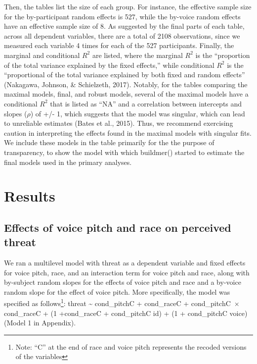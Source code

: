 \documentclass[
  english,
  man, noextraspace,floatsintext]{apa6}
\begin{document}
Then, the tables list the size of each group. For instance, the effective sample size for the by-participant random effects is 527, while the by-voice random effects have an effective sample size of 8. As suggested by the final parts of each table, across all dependent variables, there are a total of 2108 observations, since we measured each variable 4 times for each of the 527 participants. Finally, the marginal and conditional \(R^2\) are listed, where the marginal \(R^2\) is the ``proportion of the total variance explained by the fixed effects,'' while conditional \(R^2\) is the ``proportional of the total variance explained by both fixed and random effects'' (Nakagawa, Johnson, \& Schielzeth, 2017). Notably, for the tables comparing the maximal models, final, and robust models, several of the maximal models have a conditional \(R^2\) that is listed as ``NA'' and a correlation between intercepts and slopes (\(\rho\)) of +/- 1, which suggests that the model was singular, which can lead to unreliable estimates (Bates et al., 2015). Thus, we recommend exercising caution in interpreting the effects found in the maximal models with singular fits. We include these models in the table primarily for the the purpose of transparency, to show the model with which buildmer() started to estimate the final models used in the primary analyses.

\hypertarget{results}{%
\section{Results}\label{results}}

\hypertarget{effects-of-voice-pitch-and-race-on-perceived-threat}{%
\subsection{Effects of voice pitch and race on perceived threat}\label{effects-of-voice-pitch-and-race-on-perceived-threat}}

We ran a multilevel model with threat as a dependent variable and fixed effects for voice pitch, race, and an interaction term for voice pitch and race, along with by-subject random slopes for the effects of voice pitch and race and a by-voice random slope for the effect of voice pitch. More specifically, the model was specified as follows\footnote{Note: ``C'' at the end of race and voice pitch represents the recoded versions of the variables}: threat \textasciitilde{} cond\_pitchC + cond\_raceC + cond\_pitchC~\(\times\) cond\_raceC + (1 +cond\_raceC + cond\_pitchC\textbar{} id) + (1 + cond\_pitchC\textbar{} voice) (Model 1 in Appendix).
\end{document}
